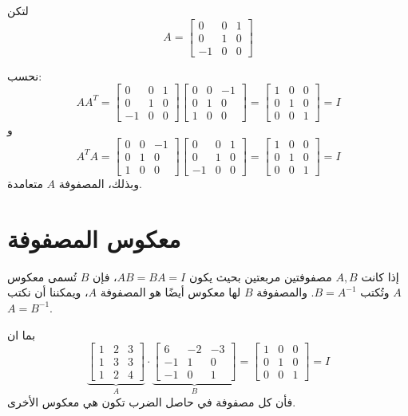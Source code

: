 	\begin{example}
		
		لتكن
		\[
		A =
		\begin{bmatrix}
			0 & 0 & 1 \\
			0 & 1 & 0 \\
			-1 & 0 & 0
		\end{bmatrix}
		\]
		
		نحسب:
		\[
		A A^T =
		\begin{bmatrix}
			0 & 0 & 1 \\
			0 & 1 & 0 \\
			-1 & 0 & 0
		\end{bmatrix}
		\begin{bmatrix}
			0 & 0 & -1 \\
			0 & 1 & 0 \\
			1 & 0 & 0
		\end{bmatrix}
		=
		\begin{bmatrix}
			1 & 0 & 0 \\
			0 & 1 & 0 \\
			0 & 0 & 1
		\end{bmatrix} = I
		\]
		و
		\[
		A^T A =
		\begin{bmatrix}
			0 & 0 & -1 \\
			0 & 1 & 0 \\
			1 & 0 & 0
		\end{bmatrix}
		\begin{bmatrix}
			0 & 0 & 1 \\
			0 & 1 & 0 \\
			-1 & 0 & 0
		\end{bmatrix}
		=
		\begin{bmatrix}
			1 & 0 & 0 \\
			0 & 1 & 0 \\
			0 & 0 & 1
		\end{bmatrix} = I
		\]
		وبذلك، المصفوفة \(A\) متعامدة.
	\end{example}
	
	\section{معكوس المصفوفة}
	إذا كانت $A, B$ مصفوفتين مربعتين بحيث يكون $AB = BA = I$، فإن $B$ تُسمى معكوس $A$ وتُكتب $B = A^{-1}$.  
	والمصفوفة $B$ لها معكوس أيضًا هو المصفوفة $A$، ويمكننا أن نكتب $A = B^{-1}$.
	
	\begin{example}
		بما ان
		\[
		\underbrace{
			\begin{bmatrix}
				1&2&3\\
				1&3&3\\
				1&2&4
			\end{bmatrix}
		}_A
		\cdot
		\underbrace{
			\begin{bmatrix}
				6&-2&-3\\
				-1&1&0\\
				-1&0&1
			\end{bmatrix}
		}_B
		=
		\begin{bmatrix}
			1&0&0\\
			0&1&0\\
			0&0&1
		\end{bmatrix} = I
		\]
		فأن كل مصفوفة في حاصل الضرب تكون هي معكوس الأخرى.
	\end{example}
